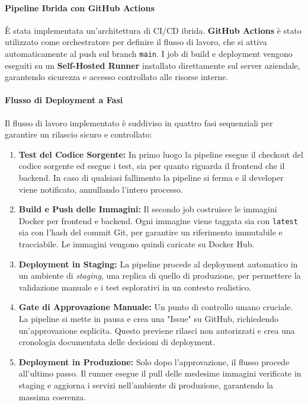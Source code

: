 \documentclass[12pt,a4paper,openright,twoside]{book}
\begin{document}
\paragraph{Pipeline Ibrida con GitHub Actions}
È stata implementata un'architettura di CI/CD ibrida. \textbf{GitHub Actions} è stato utilizzato come orchestratore per definire il flusso di lavoro, che si attiva automaticamente al push sul branch \texttt{main}. I job di build e deployment vengono eseguiti su un \textbf{Self-Hosted Runner} installato direttamente sul server aziendale, garantendo sicurezza e accesso controllato alle risorse interne.

\paragraph{Flusso di Deployment a Fasi}
Il flusso di lavoro implementato è suddiviso in quattro fasi sequenziali per garantire un rilascio sicuro e controllato:
\begin{enumerate}
    \item \textbf{Test del Codice Sorgente:} In primo luogo la pipeline esegue il checkout del codice sorgente ed esegue i test, sia per quanto riguarda il frontend che il backend. In caso di qualsiasi fallimento la pipeline si ferma e il developer viene notificato, annullando l'intero processo.
    \item \textbf{Build e Push delle Immagini:} Il secondo job costruisce le immagini Docker per frontend e backend. Ogni immagine viene taggata sia con \texttt{latest} sia con l'hash del commit Git, per garantire un riferimento immutabile e tracciabile. Le immagini vengono quindi caricate su Docker Hub.

    \item \textbf{Deployment in Staging:} La pipeline procede al deployment automatico in un ambiente di \textit{staging}, una replica di quello di produzione, per permettere la validazione manuale e i test esplorativi in un contesto realistico.

    \item \textbf{Gate di Approvazione Manuale:} Un punto di controllo umano cruciale. La pipeline si mette in pausa e crea una "Issue" su GitHub, richiedendo un'approvazione esplicita. Questo previene rilasci non autorizzati e crea una cronologia documentata delle decisioni di deployment.

    \item \textbf{Deployment in Produzione:} Solo dopo l'approvazione, il flusso procede all'ultimo passo. Il runner esegue il pull delle medesime immagini verificate in staging e aggiorna i servizi nell'ambiente di produzione, garantendo la massima coerenza.
\end{enumerate}
\end{document}

